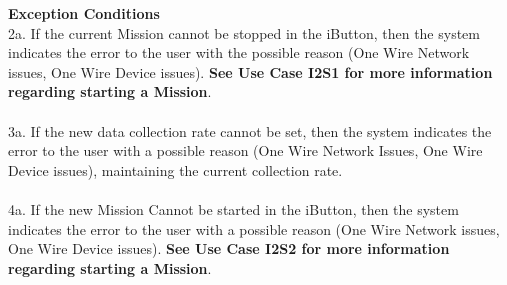 \documentclass[letterpaper]{article}
\begin{document}
\textbf{Exception Conditions}\\
2a.  If the current Mission cannot be stopped in the iButton, then
the system indicates the error to the user with the possible reason
(One Wire Network issues, One Wire Device issues).  \textbf{See
Use Case I2S1 for more information regarding starting a Mission}.
\\\\
3a.  If the new data collection rate cannot be set, then the system
indicates the error to the user with a possible reason (One Wire
Network Issues, One Wire Device issues), maintaining the current
collection rate.\\\\
4a.  If the new Mission Cannot be started in the iButton, then the
system indicates the error to the user with a possible reason
(One Wire Network issues, One Wire Device issues).  \textbf{See
Use Case I2S2 for more information regarding starting a Mission}.
\end{document}
